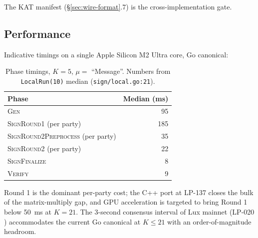 The KAT manifest (\S\ref{sec:wire-format}.7) is the cross-implementation gate.

\subsection{Performance}

Indicative timings on a single Apple Silicon M2 Ultra core, Go canonical:

\begin{table}[H]
\centering
\caption{Phase timings, $K = 5$, $\mu = $ ``Message''. Numbers from \texttt{LocalRun(10)} median (\texttt{sign/local.go:21}).}
\begin{tabular}{lr}
\toprule
Phase & Median (ms) \\
\midrule
\textsc{Gen}                  & 95 \\
\textsc{SignRound1} (per party)            & 185 \\
\textsc{SignRound2Preprocess} (per party)  & 35 \\
\textsc{SignRound2}  (per party)           & 22 \\
\textsc{SignFinalize}        & 8 \\
\textsc{Verify}              & 9 \\
\bottomrule
\end{tabular}
\end{table}

Round 1 is the dominant per-party cost; the C++ port at LP-137 closes the bulk of the matrix-multiply gap, and GPU acceleration is targeted to bring Round 1 below 50~ms at $K = 21$. The 3-second consensus interval of Lux mainnet (LP-020 \cite{lp020}) accommodates the current Go canonical at $K \le 21$ with an order-of-magnitude headroom.
